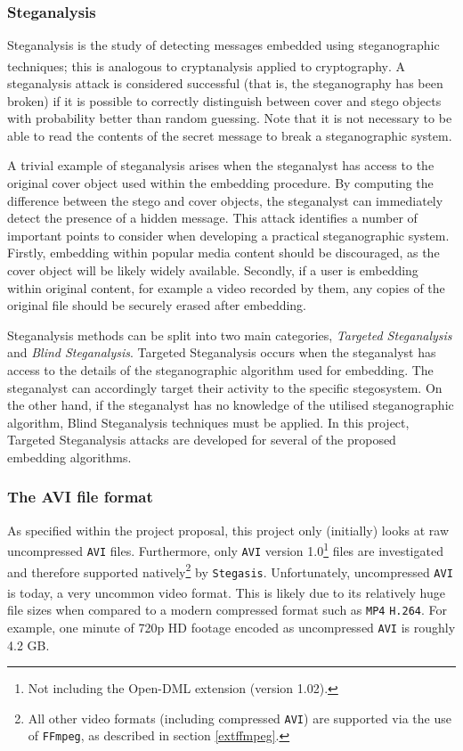 \documentclass[paper=a4, fontsize=11pt,twoside]{scrartcl}
\numberwithin{table}{section}
\numberwithin{figure}{section}
\numberwithin{algorithm}{section}
\begin{document}
\subsubsection{Steganalysis}
Steganalysis is the study of detecting messages embedded using steganographic techniques; this is analogous to cryptanalysis applied to cryptography\textsuperscript{\cite{steganalysis}}. A steganalysis attack is considered successful (that is, the steganography has been broken) if it is possible to correctly distinguish between cover and stego objects with probability better than random guessing. Note that it is not necessary to be able to read the contents of the secret message to break a steganographic system.

A trivial example of steganalysis arises when the steganalyst has access to the original cover object used within the embedding procedure. By computing the difference between the stego and cover objects, the steganalyst can immediately detect the presence of a hidden message. This attack identifies a number of important points to consider when developing a practical steganographic system. Firstly, embedding within popular media content should be discouraged, as the cover object will be likely widely available. Secondly, if a user is embedding within original content, for example a video recorded by them, any copies of the original file should be securely erased after embedding.

Steganalysis methods can be split into two main categories, \textit{Targeted Steganalysis} and \textit{Blind Steganalysis}. Targeted Steganalysis occurs when the steganalyst has access to the details of the steganographic algorithm used for embedding. The steganalyst can accordingly target their activity to the specific stegosystem. On the other hand, if the steganalyst has no knowledge of the utilised steganographic algorithm, Blind Steganalysis techniques must be applied. In this project, Targeted Steganalysis attacks are developed for several of the proposed embedding algorithms.

\subsubsection{The AVI file format}
\label{avi}
As specified within the project proposal, this project only (initially) looks at raw uncompressed \texttt{AVI} files. Furthermore, only \texttt{AVI} version 1.0\footnote{Not including the Open-DML extension (version 1.02).} files are investigated and therefore supported natively\footnote{All other video formats (including compressed \texttt{AVI}) are supported via the use of \texttt{FFmpeg}, as described in section \ref{extffmpeg}.} by \texttt{Stegasis}. Unfortunately, uncompressed \texttt{AVI} is today, a very uncommon video format\textsuperscript{\cite{avicommon}}. This is likely due to its relatively huge file sizes when compared to a modern compressed format such as \texttt{MP4} \texttt{H.264}. For example, one minute of 720p HD footage encoded as uncompressed \texttt{AVI} is roughly 4.2 GB.
\end{document}
